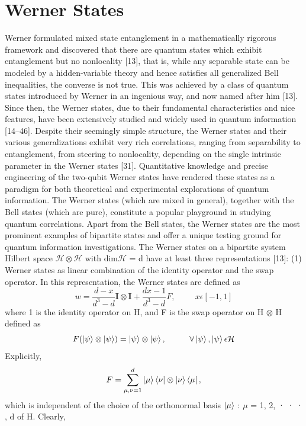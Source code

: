 \section{Werner States}
Werner formulated mixed state entanglement in a mathematically rigorous framework
and discovered that there are quantum states which exhibit entanglement but no nonlocality [13],
that is, while any separable state can be modeled by a hidden-variable theory and hence satisfies all
generalized Bell inequalities, the converse is not true. This was achieved by a class of quantum states
introduced by Werner in an ingenious way, and now named after him [13]. Since then, the Werner
states, due to their fundamental characteristics and nice features, have been extensively studied and
widely used in quantum information [14–46]. Despite their seemingly simple structure, the Werner
states and their various generalizations exhibit very rich correlations, ranging from separability to
entanglement, from steering to nonlocality, depending on the single intrinsic parameter in the Werner states [31]. Quantitative knowledge and precise engineering of the two-qubit Werner states have rendered these states as a paradigm for both theoretical and experimental explorations of quantum
information. The Werner states (which are mixed in general), together with the Bell states (which
are pure), constitute a popular playground in studying quantum correlations.
Apart from the Bell states, the Werner states are the most prominent examples of bipartite states
and offer a unique testing ground for quantum information investigations. The Werner states on a
bipartite system Hilbert space $\mathcal{H} \otimes \mathcal{H}$ with dim$\mathcal{H}$ = d have at least three representations [13]:
(1) Werner states as linear combination of the identity operator and the swap operator. In this
representation, the Werner states are defined as
\begin{equation*}
    w=\frac{d-x}{d^3-d}\mathbf{I}\otimes\mathbf{I} + \frac{dx-1}{d^3-d}F,\hspace{1cm} x \epsilon [-1,1]
\end{equation*}
where 1 is the identity operator on H, and F is the swap operator on H $\otimes$ H defined as 
\begin{equation*}
    F(\ket{\psi} \otimes \ket{\psi}) = \ket{\psi} \otimes \ket{\psi}, \hspace{1cm} \forall \ket{\psi}, \ket{\psi} \epsilon \mathcal{H}    
\end{equation*}
Explicitly,
\begin{equation*}
    F = \sum^{d}_{\mu,\nu=1} \ket{\mu}\bra{\nu} \otimes \ket{\nu}\bra{\mu},
\end{equation*}
which is independent of the choice of the orthonormal basis {$\ket{\mu}$ : $\mu$ = 1, 2, · · · , d} of H. Clearly,



